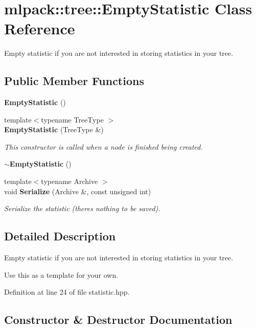 \section{mlpack\+:\+:tree\+:\+:Empty\+Statistic Class Reference}
\label{classmlpack_1_1tree_1_1EmptyStatistic}


Empty statistic if you are not interested in storing statistics in your tree.  


\subsection*{Public Member Functions}
\begin{DoxyCompactItemize}
\item 
{\bf Empty\+Statistic} ()
\item 
{\footnotesize template$<$typename Tree\+Type $>$ }\\{\bf Empty\+Statistic} (Tree\+Type \&)
\begin{DoxyCompactList}\small\item\em This constructor is called when a node is finished being created. \end{DoxyCompactList}\item 
{\bf $\sim$\+Empty\+Statistic} ()
\item 
{\footnotesize template$<$typename Archive $>$ }\\void {\bf Serialize} (Archive \&, const unsigned int)
\begin{DoxyCompactList}\small\item\em Serialize the statistic (there\textquotesingle{}s nothing to be saved). \end{DoxyCompactList}\end{DoxyCompactItemize}


\subsection{Detailed Description}
Empty statistic if you are not interested in storing statistics in your tree. 

Use this as a template for your own. 

Definition at line 24 of file statistic.\+hpp.



\subsection{Constructor \& Destructor Documentation}
